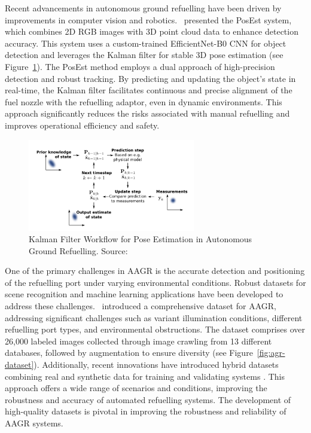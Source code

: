 \documentclass[12pt,oneside]{book} %
\begin{document}
Recent advancements in autonomous ground refuelling have been driven by
improvements in computer vision and robotics.~\citet{AGRPoseEstimation}
presented the PosEst system, which combines 2D RGB images with 3D point cloud
data to enhance detection accuracy. This system uses a custom-trained
EfficientNet-B0 CNN for object detection and leverages the Kalman filter for
stable 3D pose estimation (see Figure~\ref{fig:agr-pose-kalman}). The PosEst
method employs a dual approach of high-precision detection and robust tracking.
By predicting and updating the object’s state in real-time, the Kalman filter
facilitates continuous and precise alignment of the fuel nozzle with the
refuelling adaptor, even in dynamic environments. This approach significantly
reduces the risks associated with manual refuelling and improves operational
efficiency and safety.

\begin{figure}[H]
    \centering
    \includegraphics[width=0.65\textwidth]{figures/AGRPoseKalman.png}
    \caption{Kalman Filter Workflow for Pose Estimation in Autonomous Ground Refuelling. Source: \citet{AGRPoseEstimation}}\label{fig:agr-pose-kalman}
\end{figure}

One of the primary challenges in AAGR is the accurate detection and positioning
of the refuelling port under varying environmental conditions. Robust datasets
for scene recognition and machine learning applications have been developed to
address these challenges.~\citet{DatasetAGR} introduced a comprehensive dataset
for AAGR, addressing significant challenges such as variant illumination
conditions, different refuelling port types, and environmental obstructions.
The dataset comprises over 26,000 labeled images collected through image
crawling from 13 different databases, followed by augmentation to ensure
diversity (see Figure~\ref{fig:agr-dataset}). Additionally, recent innovations
have introduced hybrid datasets combining real and synthetic data for training
and validating systems \cite{HybridDatasetAGRV1}. This approach offers a wide
range of scenarios and conditions, improving the robustness and accuracy of
automated refuelling systems. The development of high-quality datasets is
pivotal in improving the robustness and reliability of AAGR systems.
\end{document}
